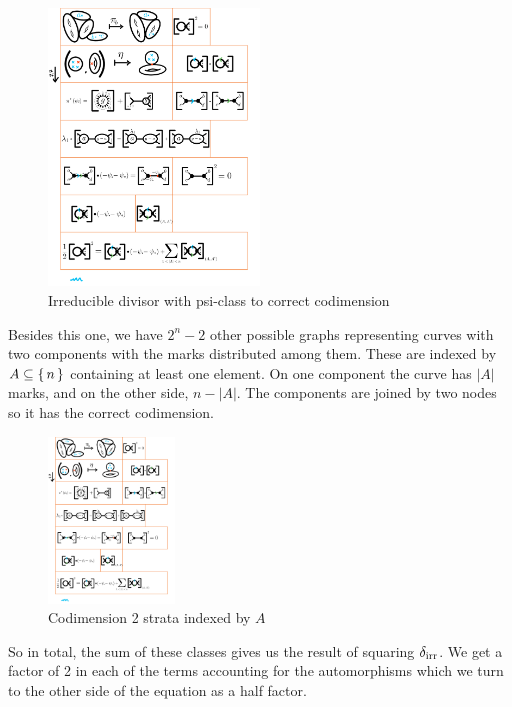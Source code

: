 \documentclass[12pt]{memoir}
\begin{document}
\begin{Ex}
     \begin{figure}[h!]
        \centering
        \includegraphics[width=0.5\textwidth, trim= 2cm 6.5cm 13.5cm 20cm,clip]{../figs/FigsDNnotability2.pdf}
        \caption{Irreducible divisor with psi-class to correct codimension}
        \label{fig:irr-squared-3}
    \end{figure}
    Besides this one, we have $2^n-2$ other possible graphs representing curves with two components with the marks distributed among them. These are indexed by $A\subseteq\{\,n\,\}$ containing at least one element. On one component the curve has $|A|$ marks, and on the other side, $n-|A|$. The components are joined by two nodes so it has the correct codimension.
     \begin{figure}[h!]
        \centering
        \includegraphics[width=0.3\textwidth, trim= 9cm 6.2cm 8.92cm 20cm,clip]{../figs/FigsDNnotability2.pdf}
        \caption{Codimension 2 strata indexed by $A$}
        \label{fig:irr-squared-4}
    \end{figure}
    So in total, the sum of these classes gives us the result of squaring $\delta_{\text{irr}}$. We get a factor of 2 in each of the terms accounting for the automorphisms which we turn to the other side of the equation as a half factor.%


\end{Ex}
\end{document}
